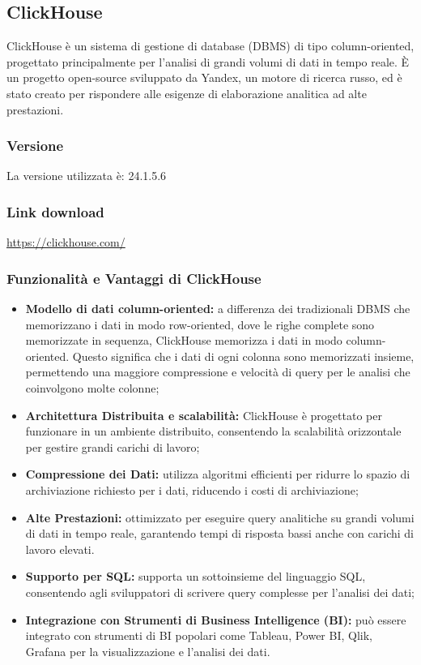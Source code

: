 \subsection{ClickHouse} \label{sec:clickHouse}
ClickHouse è un sistema di gestione di database (DBMS) di tipo column-oriented, progettato principalmente per l'analisi di grandi volumi di dati in tempo reale. È un progetto open-source sviluppato da Yandex, un motore di ricerca russo, ed è stato creato per rispondere alle esigenze di elaborazione analitica ad alte prestazioni.
\subsubsection{Versione}
La versione utilizzata è: 24.1.5.6
\subsubsection{Link download}
\href{https://clickhouse.com/}{https://clickhouse.com/}

\subsubsection*{Funzionalità e Vantaggi di ClickHouse}
\begin{itemize}
    \item \textbf{ Modello di dati column-oriented:} a differenza dei tradizionali DBMS che memorizzano i dati in modo row-oriented, dove le righe complete sono memorizzate in sequenza, ClickHouse memorizza i dati in modo column-oriented. Questo significa che i dati di ogni colonna sono memorizzati insieme, permettendo una maggiore compressione e velocità di query per le analisi che coinvolgono molte colonne;
    \item \textbf{Architettura Distribuita e scalabilità:} ClickHouse è progettato per funzionare in un ambiente distribuito, consentendo la scalabilità orizzontale per gestire grandi carichi di lavoro;
    \item \textbf{Compressione dei Dati:} utilizza algoritmi efficienti per ridurre lo spazio di archiviazione richiesto per i dati, riducendo i costi di archiviazione;
    \item \textbf{Alte Prestazioni:} ottimizzato per eseguire query analitiche su grandi volumi di dati in tempo reale, garantendo tempi di risposta bassi anche con carichi di lavoro elevati.
    \item \textbf{Supporto per SQL:} supporta un sottoinsieme del linguaggio SQL, consentendo agli sviluppatori di scrivere query complesse per l'analisi dei dati;
    \item \textbf{Integrazione con Strumenti di Business Intelligence (BI):} può essere integrato con strumenti di BI popolari come Tableau, Power BI, Qlik, Grafana per la visualizzazione e l'analisi dei dati.
\end{itemize}



